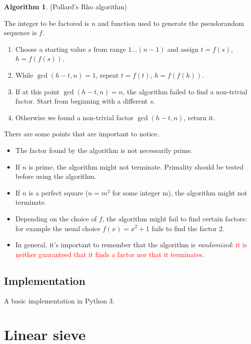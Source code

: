 \documentclass[12pt] {article}
\theoremstyle{plain}
\theoremstyle{definition}
\newtheorem{algo}[thm]{Algorithm}
\begin{document}
\begin{algo} (Pollard's Rho algorithm)

The integer to be factored is $n$ and function used to generate the pseudorandom sequence is $f$.
\begin{enumerate}
\item Choose a starting value $s$ from range $1 \dots (n-1)$ and assign $t = f(s)$, $h = f(f(s))$.
\item While $\gcd(h-t, n) = 1$, repeat $t = f(t)$, $h = f(f(h))$.
\item If at this point $\gcd(h-t, n) = n$, the algorithm failed to find a non-trivial factor. Start from beginning with a different $s$.
\item Otherwise we found a non-trivial factor $\gcd(h-t, n)$, return it.
\end{enumerate}
\end{algo}

There are some points that are important to notice.

\begin{itemize}
\item The factor found by the algorithm is not necessarily prime.
\item If $n$ is prime, the algorithm might not terminate. Primality should be tested before using the algorithm.
\item If $n$ is a perfect square ($n = m^2$ for some integer m), the algorithm might not terminate.
\item Depending on the choice of $f$, the algorithm might fail to find certain factors: for example the usual choice $f(x) = x^2 + 1$ fails to find the factor 2\cite{pollardfail}.
\item In general, it's important to remember that the algorithm is \textit{randomized}: \textcolor{red}{it is neither guaranteed that it finds a factor nor that it terminates}\cite{clrs}.
\end{itemize}

\subsection {Implementation}

A basic implementation in Python 3.



\section {Linear sieve}
\end{document}
